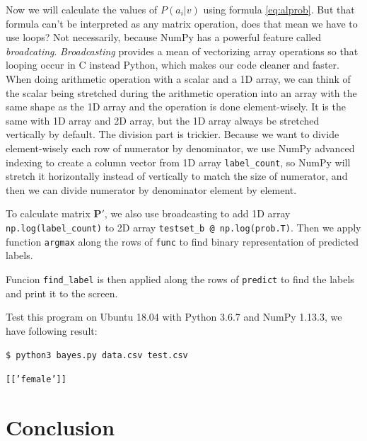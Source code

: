 \documentclass[a4paper]{article}
\newcommand{\matr}[1]{\mathbf{#1}}
\newcommand{\code}[1]{\texttt{#1}}
\begin{document}
		

		Now we will calculate the values of $P(a_i|v)$ using formula
		\eqref{eq:alprob}.
		But that formula can't be interpreted as any matrix operation, does that
		mean we have to use loops? Not necessarily, because NumPy has a powerful
		feature called \textit{broadcating}. \textit{Broadcasting} provides a mean
		of vectorizing array operations so that looping occur in C instead Python,
		which makes our code cleaner and faster. When doing arithmetic operation
		with a scalar and a 1D array, we can think of the scalar being stretched
		during the arithmetic operation into an array with the same shape as the 1D
		array and the operation is done element-wisely. It is the same with 1D
		array and 2D array, but the 1D array always be stretched vertically by
		default. The division part is trickier. Because we want to divide element-wisely each
		row of numerator by denominator, we use NumPy advanced
		indexing to create a column vector from 1D array \code{label\_count}, so
		NumPy will stretch it horizontally instead of vertically to match the size of numerator, and then
		we can divide numerator by denominator element by element.

		
		
		To calculate matrix $\matr{P'}$, we also use broadcasting to add 1D array
		\code{np.log(label\_count)} to 2D array \code{testset\_b @ np.log(prob.T)}.
		Then we apply function \code{argmax} along the rows of \code{func} to find
		binary representation of predicted labels.

		

		Funcion \code{find\_label} is then applied along the rows of \code{predict}
		to find the labels and print it to the screen.

		

		Test this program on Ubuntu 18.04 with Python 3.6.7 and NumPy 1.13.3, we
		have following result:

		\code{\$ python3 bayes.py data.csv test.csv}

		\code{[['female']]}

\section{Conclusion}
\end{document}
